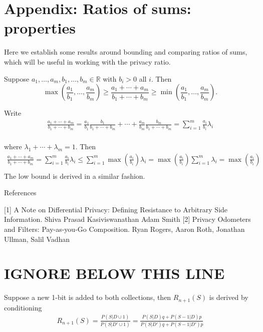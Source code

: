 \documentclass[11pt]{article}
\newcommand{\R}{\mathbb{R}}
\begin{document}
\section{Appendix: Ratios of sums: properties}

Here we establish some results around bounding and comparing ratios of sums, which will be useful in working with the privacy ratio.


\begin{lem} \label{lem:rsbound}
Suppose $a_1,\dots,a_m,b_1,\dots,b_m \in \R$ with $b_i > 0$ all $i$.
Then 
\[ \max\left(\frac{a_1}{b_1},\dots,\frac{a_m}{b_m}\right) \geq  \frac{a_1 + \cdots + a_m}{b_1 + \cdots + b_m} \geq \min \left(\frac{a_1}{b_1},\dots,\frac{a_m}{b_m}\right). \]
\end{lem}
\begin{pf}
Write
 \begin{align*}
  \frac{a_1 + \cdots + a_m}{b_1 + \cdots + b_m}
= \frac{a_1}{b_1}\frac{b_1}{b_1+\cdots+b_m} +
\cdots + \frac{a_m}{b_m}\frac{b_m}{b_1+\cdots+b_m} = \sum_{i=1}^m \frac{a_i}{b_i} \lambda_i  \\ 
\end{align*}

where $\lambda_1 + \cdots + \lambda_m = 1$.  Then
 \begin{align*}
  \frac{a_1 + \cdots + a_m}{b_1 + \cdots + b_m} = \sum_{i=1}^m \frac{a_i}{b_i} \lambda_i  \leq  \sum_{i=1}^m \max \left ( \frac{a_i}{b_i} \right ) \lambda_i  = \max \left ( \frac{a_i}{b_i} \right ) \sum_{i=1}^m \lambda_i = \max \left ( \frac{a_i}{b_i} \right ) \\ 
\end{align*}
The low bound is derived in a similar fashion. 
\end{pf}


\newpage

References

[1] A Note on Differential Privacy: Defining Resistance to Arbitrary Side Information.  Shiva Prasad Kasiviswanathan Adam Smith
[2] Privacy Odometers and Filters: Pay-as-you-Go Composition. Ryan Rogers, Aaron Roth, Jonathan Ullman, Salil Vadhan


 \newpage
 \section{IGNORE BELOW THIS LINE}
 
 Suppose a new 1-bit is added to both collections, then $R_{n+1}(S)$ is derived by conditioning
 \begin{align*}
R_{n+1}(S) = \frac{ P(S|D \cup 1) }{ P(S|D' \cup 1) } = \frac { P(S|D)q + P(S-1|D)p } { P(S|D')q + P(S-1|D')p}
\end{align*}
 
\end{document}
